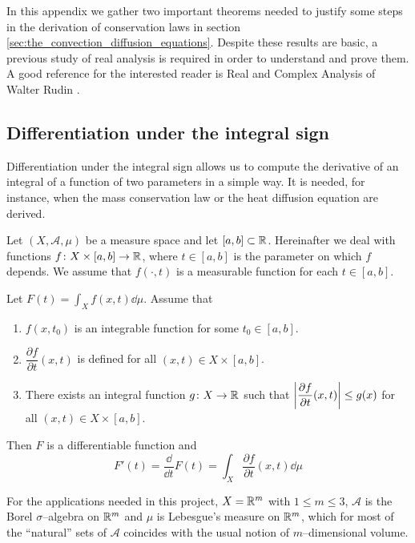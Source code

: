 In this appendix we gather two important theorems needed to justify some steps
in the derivation of conservation laws in section
\ref{sec:the_convection_diffusion_equations}. Despite these results are basic, a
previous study of real analysis is required in order to understand and prove
them. A good reference for the interested reader is Real and Complex Analysis of
Walter Rudin \cite{rudin1987real}. 

\subsection{Differentiation under the integral sign}

Differentiation under the integral sign allows us to compute the derivative of
an integral of a function of two parameters in a simple way. It is needed, for
instance, when the mass conservation law or the heat diffusion equation are
derived. 

Let $(X, \mathcal{A}, \mu)$ be a measure space and let $[a, b] \subset \mathbb{R}$.
Hereinafter we deal with functions $f \colon X \times [a,b] \rightarrow \mathbb{R}$,
where $t \in [a, b]$ is the parameter on which $f$ depends. We assume that
$f(\cdot, t)$ is a measurable function for each $t \in [a, b]$.

\begin{theorem}
	\label{theo:differentiation_under_the_integral_sign} Let $F(t) = \int_X
	f(x,t) \dd{\mu}$. Assume that
	\begin{enumerate}[label={(\roman*)}, topsep=0pt]
		\item $f(x,t_0)$ is an integrable function for some $t_0 \in
		[a,b]$.
		\item $\dfrac{\partial f}{\partial t}(x,t)$ is defined for all
		$(x, t) \in X \times [a, b]$.
		\item There exists an integral function $g \colon X \rightarrow \mathbb{R}$
		such that $\abs{\dfrac{\partial f}{\partial t} (x,t)} \leq
		g(x)$ for all $(x, t) \in X \times [a, b]$.
	\end{enumerate}
	Then $F$ is a differentiable function and
	\[
		F'(t) = \frac{\dd}{\dd t} F(t) = \int_X \frac{\partial f}{\partial t}(x,t) \dd{\mu}
	\]
\end{theorem}

For the applications needed in this project, $X = \mathbb{R}^m$ with $1 \leq m \leq
3$, $\mathcal{A}$ is the Borel $\sigma$--algebra on $\mathbb{R}^m$ and $\mu$ is
Lebesgue's measure on $\mathbb{R}^m$, which for most of the ``natural'' sets of
$\mathcal{A}$ coincides with the usual notion of $m$--dimensional volume.

